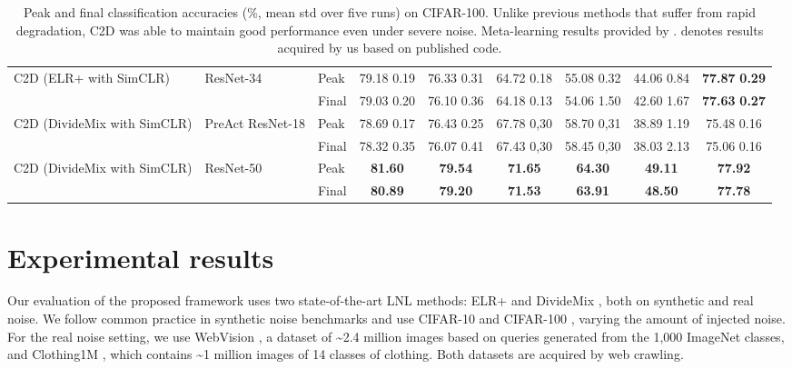 \documentclass[10pt,twocolumn,letterpaper]{article}
\renewcommand{\cite}[1]{\citep{#1}}
\newcommand{\eb}[1]{{\scriptsize\,\,#1}}
\begin{document}
\begin{table*}
{\begin{tabular}{@{\extracolsep{4pt}}l l l ccccc c@{}}
	\midrule	
\multirow{2}{*}{C2D (ELR+ with SimCLR)}  & \multirow{2}{*}{ResNet-34 }      & Peak  & 79.18\eb{0.19}&	76.33\eb{0.31}& 64.72\eb{0.18}&55.08\eb{0.32} &  44.06\eb{0.84}  & \textbf{77.87\eb{0.29}}\\	            
			                &                               & Final  & 79.03\eb{0.20}  & 76.10\eb{0.36} & 64.18\eb{0.13} &   54.06\eb{1.50}   &  42.60\eb{1.67}  &  \textbf{77.63\eb{0.27}} \\	        	
\midrule		
\multirow{2}{*}{C2D (DivideMix with SimCLR) } &    \multirow{2}{*}{PreAct ResNet-18} 	& Peak & 78.69\eb{0.17}     & 76.43\eb{0.25}    &67.78\eb{0,30}      &58.70\eb{0,31}& 38.89\eb{1.19}&       75.48\eb{0.16}   \\	            
         &                    & Final                               & 78.32\eb{0.35}      & 76.07\eb{0.41}     &67.43\eb{0,30}      &58.45\eb{0,30}& 38.03\eb{2.13}&       75.06\eb{0.16}     \\	
\midrule		
\multirow{2}{*}{C2D (DivideMix with SimCLR) } &     \multirow{2}{*}{ResNet-50 }	& Peak & \textbf{81.60}      & \textbf{79.54}     &\textbf{71.65}      &\textbf{64.30}& \textbf{49.11} & \textbf{77.92}     \\	            
&&                                                                Final & \textbf{80.89}      & \textbf{79.20}     &\textbf{71.53}      &\textbf{63.91}& \textbf{48.50} & \textbf{77.78}     \\	
\bottomrule
\end{tabular}
}
	\caption{
			Peak and final classification accuracies (\%,  mean\eb{std} over five runs) on CIFAR-100. Unlike previous methods that suffer from rapid degradation, C2D was able to maintain good performance even under severe noise. Meta-learning results provided by \citet{li2020dividemix}.  denotes results acquired by us based on published code.
		}
	\label{tbl:cifar100}
\end{table*}	 
\section{Experimental results}
\label{sec:exp}

Our evaluation of the proposed framework uses two state-of-the-art LNL methods: ELR+ \cite{liu2020earlylearning} and DivideMix \cite{li2020dividemix}, both on synthetic and real noise. We follow common practice in synthetic noise benchmarks and use CIFAR-10 and CIFAR-100 \cite{krizhevsky2009cifar}, varying the amount of injected noise. For the real noise setting, we use WebVision \cite{li2017webvision}, a dataset of \textasciitilde2.4 million images based on queries generated from the 1,000 ImageNet \cite{ILSVRC15} classes, and Clothing1M \cite{xiao2015learning}, which contains \textasciitilde1 million images of 14 classes of clothing. Both datasets are acquired by web crawling.
\end{document}
